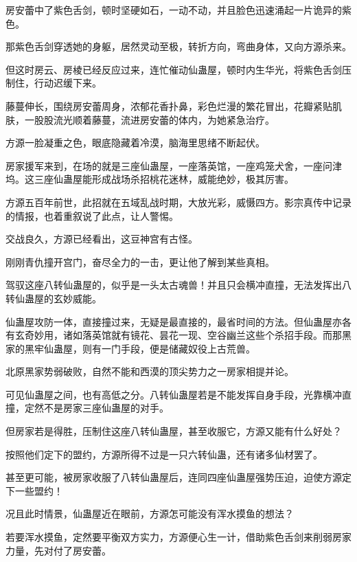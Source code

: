 
\begin{this_body}

房安蕾中了紫色舌剑，顿时坚硬如石，一动不动，并且脸色迅速涌起一片诡异的紫色。

那紫色舌剑穿透她的身躯，居然灵动至极，转折方向，弯曲身体，又向方源杀来。

但这时房云、房棱已经反应过来，连忙催动仙蛊屋，顿时内生华光，将紫色舌剑压制住，行动迟缓下来。

藤蔓伸长，围绕房安蕾周身，浓郁花香扑鼻，彩色烂漫的繁花冒出，花瓣紧贴肌肤，一股股流光顺着藤蔓，流进房安蕾的体内，为她紧急治疗。

方源一脸凝重之色，眼底隐藏着冷漠，脑海里思绪不断起伏。

房家援军来到，在场的就是三座仙蛊屋，一座落英馆，一座鸡笼犬舍，一座问津坞。这三座仙蛊屋能形成战场杀招桃花迷林，威能绝妙，极其厉害。

方源五百年前世，此招就在五域乱战时期，大放光彩，威慑四方。影宗真传中记录的情报，也着重叙说了此点，让人警惕。

交战良久，方源已经看出，这豆神宫有古怪。

刚刚青仇撞开宫门，奋尽全力的一击，更让他了解到某些真相。

驾驭这座八转仙蛊屋的，似乎是一头太古魂兽！并且只会横冲直撞，无法发挥出八转仙蛊屋的玄妙威能。

仙蛊屋攻防一体，直接撞过来，无疑是最直接的，最省时间的方法。但仙蛊屋亦各有玄奇妙用，诸如落英馆就有镜花、昙花一现、空谷幽兰这些个杀招手段。而那黑家的黑牢仙蛊屋，则有一门手段，便是储藏奴役上古荒兽。

北原黑家势弱破败，自然不能和西漠的顶尖势力之一房家相提并论。

可见仙蛊屋之间，也有高低之分。八转仙蛊屋若是不能发挥自身手段，光靠横冲直撞，定然不是房家三座仙蛊屋的对手。

但房家若是得胜，压制住这座八转仙蛊屋，甚至收服它，方源又能有什么好处？

按照他们定下的盟约，方源所得不过是一只六转仙蛊，还有诸多仙材罢了。

甚至更可能，被房家收服了八转仙蛊屋后，连同四座仙蛊屋强势压迫，迫使方源定下一些盟约！

况且此时情景，仙蛊屋近在眼前，方源怎可能没有浑水摸鱼的想法？

若要浑水摸鱼，定然要平衡双方实力，方源便心生一计，借助紫色舌剑来削弱房家力量，先对付了房安蕾。


\end{this_body}
